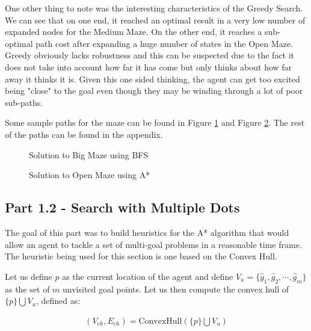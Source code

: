 \documentclass{article}[12pt]
\begin{document}
   One other thing to note was the interesting characteristics of the Greedy Search. We can see that on one end, it reached an optimal result in a very low number of expanded nodes for the Medium Maze. On the other end, it reaches a sub-optimal path cost after expanding a huge number of states in the Open Maze. Greedy obviously lacks robustness and this can be suspected due to the fact it does not take into account how far it has come but only thinks about how far away it thinks it is. Given this one sided thinking, the agent can get too excited being "close" to the goal even though they may be winding through a lot of poor sub-paths.
   
   Some sample paths for the maze can be found in Figure \ref{fig:bfs_bigmaze} and Figure \ref{fig:as_openmaze}. The rest of the paths can be found in the appendix.
   
   \begin{figure}[!h]
   \centering
   \caption{Solution to Big Maze using BFS}
   \label{fig:bfs_bigmaze}
   \end{figure}
   
   \begin{figure}[!h]
   \centering
   \caption{Solution to Open Maze using A*}
   \label{fig:as_openmaze}
   \end{figure}
    
   
    \newpage
   \subsection{Part 1.2 - Search with Multiple Dots}
The goal of this part was to build heuristics for the A* algorithm that would allow an agent to tackle a set of multi-goal problems in a reasonable time frame. The heuristic being used for this section is one based on the Convex Hull. 

Let us define $p$ as the current location of the agent and define $V_u = \lbrace \hat{g}_1, \hat{g}_2, \cdots, \hat{g}_m \rbrace$ as the set of $m$ unvisited goal points. Let us then compute the convex hull of $\lbrace p \rbrace \bigcup V_u$, defined as:

\begin{align*}
\left(V_{ch}, E_{ch} \right) = \text{ConvexHull}\left(\lbrace p \rbrace \bigcup V_u \right)
\end{align*}
\end{document}
